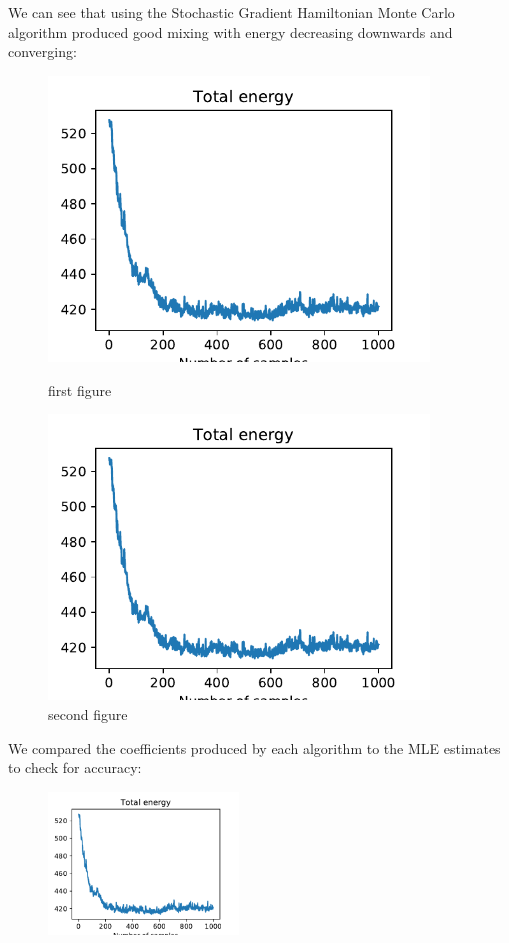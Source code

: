 We can see that using the Stochastic Gradient Hamiltonian Monte Carlo algorithm produced good mixing with energy decreasing downwards and converging:

\begin{figure}[h!]
	\centering
	\begin{minipage}{0.45\textwidth}
		\centering
		\includegraphics[width=0.9\textwidth]{hmc-energy-pima.pdf} %
		\caption{first figure}
	\end{minipage}\hfill
	\begin{minipage}{0.45\textwidth}
		\centering
		\includegraphics[width=0.9\textwidth]{hmc-energy-pima.pdf} %
		\caption{second figure}
	\end{minipage}
\end{figure}

We compared the coefficients produced by each algorithm to the MLE estimates to check for accuracy:

\begin{figure}[h!]
	\centering
		\includegraphics[width=0.45\textwidth]{hmc-energy-pima.pdf}
\end{figure}
